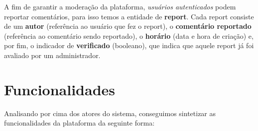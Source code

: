 
A fim de garantir a moderação da plataforma, \textit{usuários autenticados}
podem reportar comentários, para isso temos a entidade de \textbf{report}. Cada
report consiste de um \textbf{autor} (referência ao usuário que fez o report),
o \textbf{comentário reportado} (referência ao comentário sendo reportado), o
\textbf{horário} (data e hora de criação) e, por fim, o indicador de
\textbf{verificado} (booleano), que indica que aquele report já foi avaliado
por um administrador.



\section{Funcionalidades}

Analisando por cima dos atores do sistema, conseguimos sintetizar as
funcionalidades da plataforma da seguinte forma:

